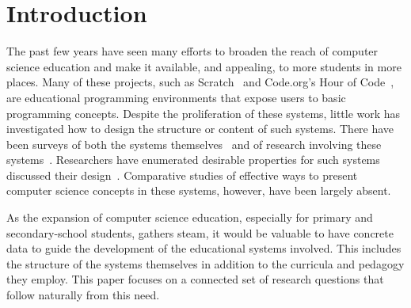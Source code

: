 \documentclass{sig-alternate}
\begin{document}
\section{Introduction}
The past few years have seen many efforts to broaden the reach of computer science education and make it available, and appealing, to more students in more places. 
Many of these projects, such as Scratch~\cite{scratch} and Code.org's Hour of Code~\cite{codedotorg}, are educational programming environments that expose users to basic programming concepts. 
Despite the proliferation of these systems, little work has investigated how to design the structure or content of such systems. There have been surveys of both the systems themselves~\cite{guzdial2004programming, kelleher2005lowering} and of research involving these systems~\cite{salleh2013analysis}. Researchers have enumerated desirable properties for such systems~\cite{repenning2010scalable} discussed their design~\cite{powers2006tools}.
Comparative studies of effective ways to present computer science concepts in these systems, however, have been largely absent. 

As the expansion of computer science education, especially for primary and secondary-school students, gathers steam, it would be valuable to have concrete data to guide the development of the educational systems involved. 
This includes the structure of the systems themselves in addition to the curricula and pedagogy they employ. 
This paper focuses on a connected set of research questions that follow naturally from this need.

\end{document}
